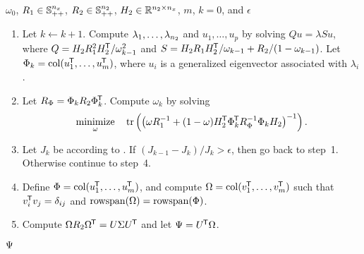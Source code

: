 \begin{algorithm}[t]
	\caption{\GEVOCI} 
	\label{alg:gevo-ci}
	\begin{small}
	\begin{algorithmic}[0]
		\Require $\omega_0$, $R_1\in\mathbb{S}_{++}^{n_x}$, $R_2\in\mathbb{S}_{++}^{n_2}$, $H_2\in{\mathbb{R}}^{n_2\times n_x}$, $m$, $k=0$, and $\epsilon$ \\
		\begin{enumerate}
			\item Let $k\leftarrow k+1$. Compute $\lambda_1,\dots,\lambda_{n_2}$ and $u_1,\dots,u_p$ by solving $Qu = \lambda Su$, where $Q = H_2R_1^2H_2^{\mkern-1.5mu\mathsf{T}}/\omega_{k-1}^2$ and $S = H_2R_1H_2^{\mkern-1.5mu\mathsf{T}}/\omega_{k-1}+R_2/(1-\omega_{k-1})$. Let $\Phi_k=\operatorname*{\rm col}(u_1^{\mkern-1.5mu\mathsf{T}},\dots,u_{m}^{\mkern-1.5mu\mathsf{T}})$, where $u_i$ is a generalized eigenvector associated with $\lambda_i$. 
			\item Let $R_\Phi=\Phi_k R_2 \Phi_k^{\mkern-1.5mu\mathsf{T}}$. Compute $\omega_k$ by solving
			\begin{equation*}
				\underset{\omega}{\operatorname*{\rm minimize}}\quad \operatorname*{\rm tr}\left(\left(\omega R_1^{-1} + (1-\omega)H_2^{\mkern-1.5mu\mathsf{T}} \Phi_k^{\mkern-1.5mu\mathsf{T}} R_\Phi^{-1} \Phi_k H_2\right)^{-1}\right).
			\end{equation*}
			\item Let $J_k$ be according to \cite[(5.39)]{Forsling2023Phd}. If $(J_{k-1}-J_k)/J_k>\epsilon$, then go back to step~1. Otherwise continue to step~4.
			\item Define $\Phi=\operatorname*{\rm col}(u_1^{\mkern-1.5mu\mathsf{T}},\dots,u_m^{\mkern-1.5mu\mathsf{T}})$, and compute $\Omega=\operatorname*{\rm col}(v_1^{\mkern-1.5mu\mathsf{T}},\dots,v_m^{\mkern-1.5mu\mathsf{T}})$ such that $v_i^{\mkern-1.5mu\mathsf{T}} v_j=\delta_{ij}$ and $\operatorname*{\rm rowspan}(\Omega)=\operatorname*{\rm rowspan}(\Phi)$.
			\item Compute $\Omega R_2\Omega^{\mkern-1.5mu\mathsf{T}} = U\Sigma U^{\mkern-1.5mu\mathsf{T}}$ and let $\Psi=U^{\mkern-1.5mu\mathsf{T}}\Omega$.
		\end{enumerate}
		\Ensure $\Psi$
	\end{algorithmic}
	\end{small}
\end{algorithm}


